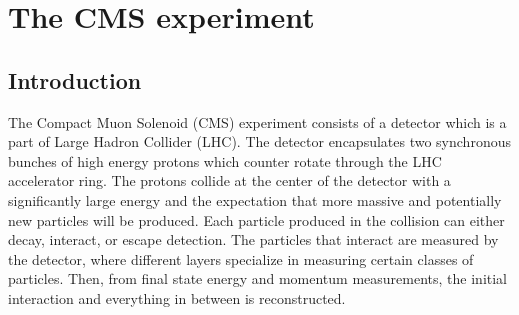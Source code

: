 \setcounter{secnumdepth}{3}
\setcounter{tocdepth}{3}
\setlength{\parskip}{\smallskipamount}
\setlength{\parindent}{0pt}


\makeatletter


\providecommand{\tabularnewline}{\\}


\makeatother


\chapter{The CMS experiment}

\section{Introduction} The Compact Muon Solenoid (CMS) experiment consists of a detector which is a part of Large Hadron Collider (LHC). The detector encapsulates two synchronous bunches of high energy protons  which counter rotate through the LHC accelerator ring.  The protons collide at the center of the detector with a significantly large energy and the expectation that more massive and potentially new particles will be produced. Each particle produced in the collision can either decay, interact, or escape detection. The particles that interact are measured by the detector, where different layers specialize in measuring certain classes of particles. Then, from final state energy and momentum measurements, the initial interaction and everything in between is reconstructed.   



